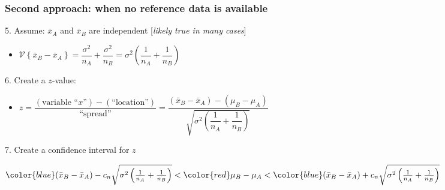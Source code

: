 \begin{frame}\frametitle{Second approach: when no reference data is available}

	5. Assume: $\bar{x}_A$ and $\bar{x}_B$ are independent [\emph{likely true in many cases}] %
	\begin{itemize}
		\item	$\mathcal{V}\left\{\bar{x}_B - \bar{x}_A\right\} = \dfrac{\sigma^2}{n_A} + \dfrac{\sigma^2}{n_B} = \sigma^2 \left(\dfrac{1}{n_A} + \dfrac{1}{n_B}\right)$
	\end{itemize}

	6. Create a $z$-value:
	
	\vspace{10pt}
	\begin{itemize}
		\item	$z = \dfrac{\left(\text{variable ``$x$''}\right) - \left(\text{``location''}\right)}{\text{``spread''}} = \dfrac{(\bar{x}_B - \bar{x}_A) - (\mu_B - \mu_A)}{\sqrt{\sigma^2 \left(\dfrac{1}{n_A} + \dfrac{1}{n_B}\right)}}$
	\end{itemize}

	7. Create a confidence interval for $z$
	
	\vspace{10pt}
	{${\color{blue} (\bar{x}_B - \bar{x}_A) - c_n \sqrt{\sigma^2 \left(\tfrac{1}{n_A} + \tfrac{1}{n_B}\right)}  } < {\color{red} \mu_B - \mu_A} < {\color{blue} (\bar{x}_B - \bar{x}_A) + c_n \sqrt{\sigma^2 \left(\tfrac{1}{n_A} + \tfrac{1}{n_B} \right)} }$}
	
	
\end{frame}

